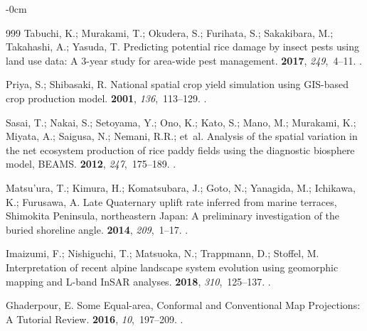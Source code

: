 \documentclass[land,article,accept,pdftex,moreauthors]{Definitions/mdpi}
\begin{document}
\begin{adjustwidth}{-\extralength}{0cm}
\begin{thebibliography}{999}
Tabuchi, K.; Murakami, T.; Okudera, S.; Furihata, S.; Sakakibara, M.;
  Takahashi, A.; Yasuda, T.
\newblock Predicting potential rice damage by insect pests using land use data:
  A 3-year study for area-wide pest management.
 {\bf 2017}, {\em
  249},~4--11.
.

Priya, S.; Shibasaki, R.
\newblock National spatial crop yield simulation using GIS-based crop
  production model.
 {\bf 2001}, {\em 136},~113--129.
.

Sasai, T.; Nakai, S.; Setoyama, Y.; Ono, K.; Kato, S.; Mano, M.; Murakami, K.;
  Miyata, A.; Saigusa, N.; Nemani, R.R.;  et~al.
\newblock Analysis of the spatial variation in the net ecosystem production of
  rice paddy fields using the diagnostic biosphere model, BEAMS.
 {\bf 2012}, {\em 247},~175--189.
.

Matsu'ura, T.; Kimura, H.; Komatsubara, J.; Goto, N.; Yanagida, M.; Ichikawa,
  K.; Furusawa, A.
\newblock Late Quaternary uplift rate inferred from marine terraces, Shimokita
  Peninsula, northeastern Japan: A preliminary investigation of the buried
  shoreline angle.
 {\bf 2014}, {\em 209},~1--17.
.

Imaizumi, F.; Nishiguchi, T.; Matsuoka, N.; Trappmann, D.; Stoffel, M.
\newblock Interpretation of recent alpine landscape system evolution using
  geomorphic mapping and L-band InSAR analyses.
 {\bf 2018}, {\em 310},~125--137.\linebreak
{}.

Ghaderpour, E.
\newblock Some Equal-area, Conformal and Conventional Map Projections: A
  Tutorial Review.
 {\bf 2016}, {\em 10},~197--209.
.


\end{thebibliography}
\end{adjustwidth}
\end{document}
